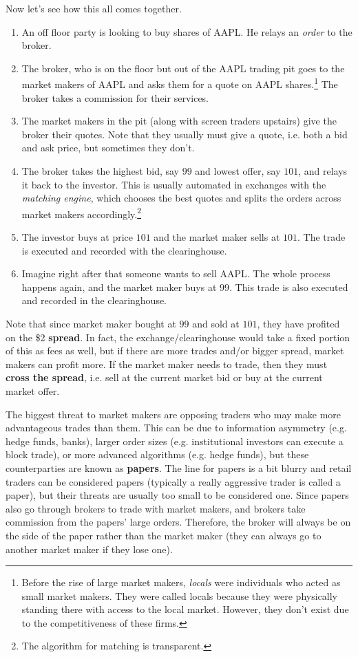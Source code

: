 \documentclass{article}
\begin{document}
    Now let's see how this all comes together. 
    \begin{enumerate}
      \item An off floor party is looking to buy shares of AAPL. He relays an \textit{order} to the broker. 
      \item The broker, who is on the floor but out of the AAPL trading pit goes to the market makers of AAPL and asks them for a quote on AAPL shares.\footnote{Before the rise of large market makers, \textit{locals} were individuals who acted as small market makers. They were called locals because they were physically standing there with access to the local market. However, they don't exist due to the competitiveness of these firms. } The broker takes a commission for their services. 
      \item The market makers in the pit (along with screen traders upstairs) give the broker their quotes. Note that they usually must give a quote, i.e. both a bid and ask price, but sometimes they don't. 
      \item The broker takes the highest bid, say $99$ and lowest offer, say $101$, and relays it back to the investor. This is usually automated in exchanges with the \textit{matching engine}, which chooses the best quotes and splits the orders across market makers accordingly.\footnote{The algorithm for matching is transparent. } 
      \item The investor buys at price $101$ and the market maker sells at $101$. The trade is executed and recorded with the clearinghouse. 
      \item Imagine right after that someone wants to sell AAPL. The whole process happens again, and the market maker buys at $99$. This trade is also executed and recorded in the clearinghouse. 
    \end{enumerate}

    Note that since market maker bought at $99$ and sold at $101$, they have profited on the \$2 \textbf{spread}. In fact, the exchange/clearinghouse would take a fixed portion of this as fees as well, but if there are more trades and/or bigger spread, market makers can profit more. If the market maker needs to trade, then they must \textbf{cross the spread}, i.e. sell at the current market bid or buy at the current market offer. 

    The biggest threat to market makers are opposing traders who may make more advantageous trades than them. This can be due to information asymmetry (e.g. hedge funds, banks), larger order sizes (e.g. institutional investors can execute a block trade), or more advanced algorithms (e.g. hedge funds), but these counterparties are known as \textbf{papers}. The line for papers is a bit blurry and retail traders can be considered papers (typically a really aggressive trader is called a paper), but their threats are usually too small to be considered one. Since papers also go through brokers to trade with market makers, and brokers take commission from the papers' large orders. Therefore, the broker will always be on the side of the paper rather than the market maker (they can always go to another market maker if they lose one). 
\end{document}
